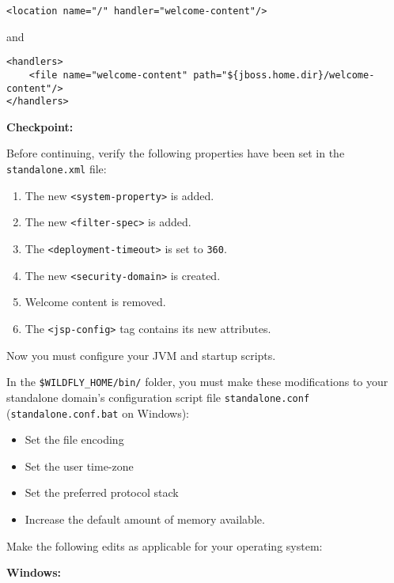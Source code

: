 \begin{enumerate}
\begin{verbatim}
<location name="/" handler="welcome-content"/>
\end{verbatim}

  and

\begin{verbatim}
<handlers>
    <file name="welcome-content" path="${jboss.home.dir}/welcome-content"/>
</handlers>
\end{verbatim}
\end{enumerate}

\textbf{Checkpoint:}

Before continuing, verify the following properties have been set in the
\texttt{standalone.xml} file:

\begin{enumerate}
\def\labelenumi{\arabic{enumi}.}
\item
  The new \texttt{\textless{}system-property\textgreater{}} is added.
\item
  The new \texttt{\textless{}filter-spec\textgreater{}} is added.
\item
  The \texttt{\textless{}deployment-timeout\textgreater{}} is set to
  \texttt{360}.
\item
  The new \texttt{\textless{}security-domain\textgreater{}} is created.
\item
  Welcome content is removed.
\item
  The \texttt{\textless{}jsp-config\textgreater{}} tag contains its new
  attributes.
\end{enumerate}

Now you must configure your JVM and startup scripts.

In the \texttt{\$WILDFLY\_HOME/bin/} folder, you must make these
modifications to your standalone domain's configuration script file
\texttt{standalone.conf} (\texttt{standalone.conf.bat} on Windows):

\begin{itemize}
\tightlist
\item
  Set the file encoding
\item
  Set the user time-zone
\item
  Set the preferred protocol stack
\item
  Increase the default amount of memory available.
\end{itemize}

Make the following edits as applicable for your operating system:

\textbf{Windows:}

